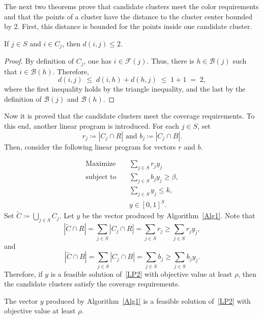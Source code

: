 The next two theorems prove that candidate clusters meet the color requirements and that the points of a cluster have the distance to the cluster center bounded by 2.
First, this distance is bounded for the points inside one candidate cluster.

\begin{theorem}
    \label{dist_upb}
    If $j \in S$ and $i \in C_j$, then $d(i,j) \leq 2$.
\end{theorem}
\begin{proof}
    
By definition of $C_j$, one has $i \in \mathcal{F}(j)$. Thus, there is \(h \in \mathcal{B}(j)\) such that \(i \in \mathcal{B}(h)\). Therefore,
\[
d(i,j)
\;\le\; d(i,h) + d(h,j)
\;\le\; 1 + 1 \;=\; 2,
\]
where the first inequality holds by the triangle inequality, and the last by the definition of $\mathcal{B}(j)$ and $\mathcal{B}(h)$.
\end{proof}

Now it is proved that the candidate clusters meet the coverage requirements. 
To this end, another linear program is introduced. 
For each $j \in S$, set 
\[
r_j \coloneqq |C_j \cap R|\text{ and } b_j \coloneqq |C_j \cap B|.
\] 
Then, consider the following linear program for vectors $r$ and $b$.

\begin{equation}\tag{LP2} \label{LP2}
\begin{aligned}
    \text{Maximize} \quad &\sum_{j \in S} r_j y_j\\
    \text{subject to} \quad& \sum_{j \in S} b_jy_j \geq \beta, \\
    &\sum_{j \in S} y_j \leq k,\\
    & y \in [0,1]^S.
\end{aligned}
\end{equation}
%
Set $\tilde{C} \coloneqq \bigcup_{j \in S} C_j$. 
Let $y$ be the vector produced by {Algorithm~\ref{Alg1}}. 
Note that \[
|\tilde{C} \cap R| = \sum_{j \in S} |C_j \cap R| = \sum_{j \in S} r_j \geq \sum_{j \in S} r_j y_j,
\]
and 
\[
|\tilde{C} \cap B| = \sum_{j \in S} |C_j \cap B| = \sum_{j \in S} b_j \geq \sum_{j \in S} b_j y_j.
\]
Therefore, if $y$ is a feasible solution of~\ref{LP2} with objective value at least $\rho$, then the candidate clusters satisfy the coverage requirements.

\begin{theorem}
    \label{feas:LP2}
The vector $y$ produced by {\rm Algorithm~\ref{Alg1}} is a feasible solution of~\ref{LP2} with objective value at least $\rho$.    
\end{theorem}

